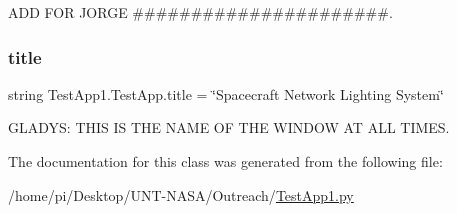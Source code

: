 A\+DD F\+OR J\+O\+R\+GE \#\#\#\#\#\#\#\#\#\#\#\#\#\#\#\#\#\#\#\#\#\#. 

\mbox{\label{classTestApp1_1_1TestApp_a9880f4943b84ff291beca794581e7ba1}} 
\subsubsection{\texorpdfstring{title}{title}}
{\footnotesize\ttfamily string Test\+App1.\+Test\+App.\+title = \char`\"{}Spacecraft Network Lighting System\char`\"{}\hspace{0.3cm}{\ttfamily [static]}}



G\+L\+A\+D\+YS\+: T\+H\+IS IS T\+HE N\+A\+ME OF T\+HE W\+I\+N\+D\+OW AT A\+LL T\+I\+M\+ES. 



The documentation for this class was generated from the following file\+:\begin{DoxyCompactItemize}
\item 
/home/pi/\+Desktop/\+U\+N\+T-\/\+N\+A\+S\+A/\+Outreach/\hyperlink{Outreach_2TestApp1_8py}{Test\+App1.\+py}\end{DoxyCompactItemize}
